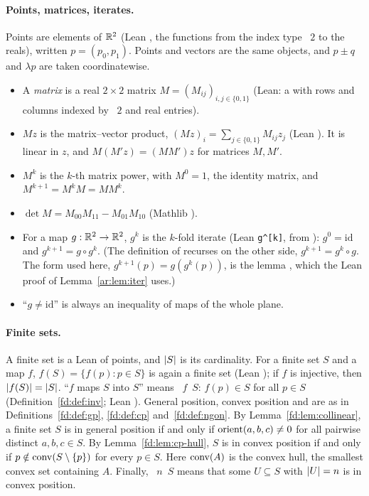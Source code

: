 \paragraph{Points, matrices, iterates.}
Points are elements of $\mathbb R^2$ (Lean , the functions from the index type ~$2$ to the reals),
written
$p=(p_0,p_1)$. Points and vectors are the same objects, and $p\pm q$ and $\lambda p$ are taken coordinatewise.
\begin{itemize}
\item A \emph{matrix} is a real $2\times2$ matrix $M=(M_{ij})_{i,j\in\{0,1\}}$ (Lean: a
 with rows and columns indexed by ~$2$ and real entries).
\item $Mz$ is the matrix--vector product, $(Mz)_i=\sum_{j\in\{0,1\}}M_{ij}z_j$ (Lean ). It is
linear in $z$, and $M(M'z)=(MM')z$ for matrices $M,M'$.
\item $M^k$ is the $k$-th matrix power, with $M^0=1$, the identity matrix, and $M^{k+1}=M^kM=MM^k$.
\item $\det M=M_{00}M_{11}-M_{01}M_{10}$ (Mathlib ).
\item For a map $g:\mathbb R^2\to\mathbb R^2$, $g^k$ is the $k$-fold iterate (Lean \texttt{g\textasciicircum[k]}, from ): $g^0=\mathrm{id}$ and
$g^{k+1}=g\circ g^k$. (The definition of  recurses on the other side, $g^{k+1}=g^k\circ g$. The
form used here, $g^{k+1}(p)=g(g^k(p))$, is the lemma , which the Lean proof of
Lemma~\ref{ar:lem:iter} uses.)
\item ``$g\ne\mathrm{id}$'' is always an inequality of maps of the whole plane.
\end{itemize}

\paragraph{Finite sets.}
A finite set is a Lean  of points, and $\lvert S\rvert$ is its cardinality. For a finite set $S$ and a map $f$,
$f(S)=\{f(p):p\in S\}$ is again a finite set (Lean ); if $f$ is injective, then $\lvert f(S)\rvert=\lvert S\rvert$.
``$f$ maps $S$ into $S$'' means ~$f$~$S$: $f(p)\in S$ for all $p\in S$ (Definition~\ref{fd:def:inv};
Lean ). General position, convex position and  are as in
Definitions~\ref{fd:def:gp}, \ref{fd:def:cp} and~\ref{fd:def:ngon}. By Lemma~\ref{fd:lem:collinear}, a finite set $S$
is in general position if and only if $\operatorname{orient}(a,b,c)\ne0$ for all pairwise distinct $a,b,c\in S$. By
Lemma~\ref{fd:lem:cp-hull}, $S$ is in convex position if and only if $p\notin\operatorname{conv}(S\setminus\{p\})$ for every $p\in
S$. Here $\operatorname{conv}(A)$ is the convex hull, the smallest convex set containing $A$. Finally, ~$n$~$S$
means that some $U\subseteq S$ with $\lvert U\rvert=n$ is in convex position.

